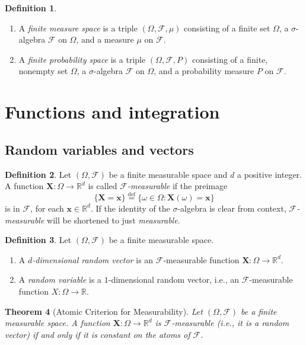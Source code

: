 \documentclass[11pt]{book}
\newtheorem{thm}{Theorem}[section]
\theoremstyle{definition}
\newtheorem{defn}[thm]{Definition}
\numberwithin{equation}{section}
\begin{document}
\begin{defn}
	\leavevmode
	\begin{enumerate}
		\item A \textit{finite measure space} is a triple $(\Omega, \mathcal{F}, \mu)$ consisting of a finite set $\Omega$, a $\sigma$-algebra $\mathcal{F}$ on $\Omega$, and a measure $\mu$ on $\mathcal{F}$.
		\item A \textit{finite probability space} is a triple $(\Omega, \mathcal{F}, P)$ consisting of a finite, nonempty set $\Omega$, a $\sigma$-algebra $\mathcal{F}$ on $\Omega$, and a probability measure $P$ on $\mathcal{F}$.
	\end{enumerate}
\end{defn}

\section{Functions and integration}

\subsection{Random variables and vectors}

\begin{defn}
	Let $(\Omega, \mathcal{F})$ be a finite measurable space and $d$ a positive integer. A function $\mathbf{X}: \Omega \to \mathbb{R}^d$ is called \textit{$\mathcal{F}$-measurable} if the preimage
	\[
		\{\mathbf{X} = \mathbf{x}\} \stackrel{\text{def}}{=} \{ \omega \in \Omega : \mathbf{X}(\omega)=\mathbf{x}\}
	\]
	is in $\mathcal{F}$, for each $\mathbf{x}\in \mathbb{R}^d$. If the identity of the $\sigma$-algebra is clear from context, \textit{$\mathcal{F}$-measurable} will be shortened to just \textit{measurable}.
\end{defn}

\begin{defn}
	Let $(\Omega, \mathcal{F})$ be a finite measurable space.
	\begin{enumerate}
		\item A \textit{$d$-dimensional random vector} is an $\mathcal{F}$-measurable function $\mathbf{X}: \Omega \to \mathbb{R}^d$.
		\item A \textit{random variable} is a $1$-dimensional random vector, i.e., an $\mathcal{F}$-measurable function $X: \Omega \to \mathbb{R}$.
	\end{enumerate}
\end{defn}

\begin{thm}[Atomic Criterion for Measurability]\label{thm:atomic-criterion-measurable}
	Let $(\Omega, \mathcal{F})$ be a finite measurable space. A function $\mathbf{X}: \Omega \to \mathbb{R}^d$ is $\mathcal{F}$-measurable (i.e., it is a random vector) if and only if it is constant on the atoms of $\mathcal{F}$.
\end{thm}
\end{document}
